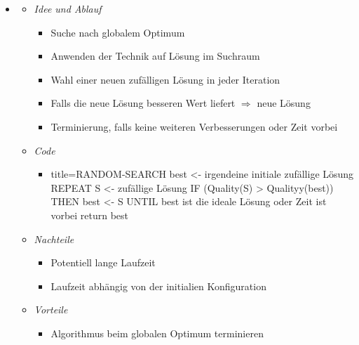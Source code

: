 \documentclass[
    12pt,
    a4paper,
    ngerman,
    color=3b,%
    marginpar=false,
    colorback=false,
    leqno,
]{tudaexercise}
\begin{document}
\begin{itemize}
        \item {}
            \begin{itemize}
                \item \textit{Idee und Ablauf}
                    \begin{itemize}
                        \item Suche nach globalem Optimum
                        \item Anwenden der Technik auf  Lösung im Suchraum
                        \item Wahl einer neuen zufälligen Lösung in jeder Iteration
                        \item Falls die neue Lösung besseren Wert liefert $\Rightarrow$ neue  Lösung
                        \item Terminierung, falls keine weiteren Verbesserungen oder Zeit vorbei
                    \end{itemize}
                \item \textit{Code}
                    \begin{itemize}
                        \item[]
                            \begin{ccode}[autogobble]{title={RANDOM-SEARCH}}
                            best <- irgendeine initiale zufällige Lösung
                            REPEAT
                                S <- zufällige Lösung
                                IF (Quality(S) > Qualityy(best)) THEN
                                    best <- S
                            UNTIL best ist die ideale Lösung oder Zeit ist vorbei
                            return best
                            \end{ccode}
                    \end{itemize}
                \item \textit{Nachteile}
                    \begin{itemize}
                        \item Potentiell lange Laufzeit
                        \item Laufzeit abhängig von der initialien Konfiguration
                    \end{itemize}
                \item \textit{Vorteile}
                    \begin{itemize}
                        \item Algorithmus  beim globalen Optimum terminieren

\end{itemize}
\end{itemize}
\end{itemize}
\end{document}
